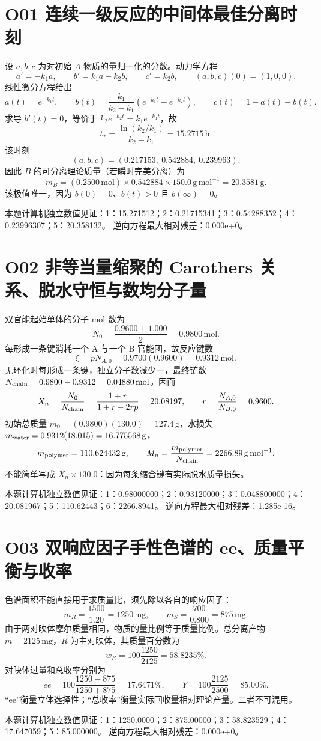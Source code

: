 \documentclass[UTF8,openany,11pt,a4paper]{ctexbook}
\begin{document}
\section{O01 \quad 连续一级反应的中间体最佳分离时刻}
设 \(a,b,c\) 为对初始 \(A\) 物质的量归一化的分数。动力学方程
\[
a'=-k_1a,\qquad b'=k_1a-k_2b,\qquad c'=k_2b,\qquad
(a,b,c)(0)=(1,0,0).
\]
线性微分方程给出
\[
a(t)=e^{-k_1t},\qquad
b(t)=\frac{k_1}{k_2-k_1}
\left(e^{-k_1t}-e^{-k_2t}\right),\qquad
c(t)=1-a(t)-b(t).
\]
求导 \(b'(t)=0\)，等价于 \(k_2e^{-k_2t}=k_1e^{-k_1t}\)，故
\[
t_*=\frac{\ln(k_2/k_1)}{k_2-k_1}
=15.2715\,\mathrm h.
\]
该时刻
\[
(a,b,c)=(0.217153,\ 0.542884,\ 0.239963).
\]
因此 \(B\) 的可分离理论质量（若瞬时完美分离）为
\[
m_B=(0.2500\,\mathrm{mol})\times0.542884\times
150.0\,\mathrm{g\,mol^{-1}}=20.3581\,\mathrm g.
\]
该极值唯一，因为 \(b(0)=0\)、\(b(t)>0\) 且 \(b(\infty)=0\)。
\begin{reviewnote}
本题计算机独立数值见证：1：15.271512；2：0.21715341；3：0.54288352；4：0.23996307；5：20.358132。
逆向方程最大相对残差：0.000e+0。
\end{reviewnote}
\section{O02 \quad 非等当量缩聚的 Carothers 关系、脱水守恒与数均分子量}
双官能起始单体的分子 mol 数为
\[
N_0=\frac{0.9600+1.000}{2}=0.9800\,\mathrm{mol}.
\]
每形成一条键消耗一个 A 与一个 B 官能团，故反应键数
\[
\xi=pN_{A,0}=0.9700(0.9600)=0.9312\,\mathrm{mol}.
\]
无环化时每形成一条键，独立分子数减少一，最终链数
\(N_{\rm chain}=0.9800-0.9312=0.04880\,\mathrm{mol}\)。因而
\[
X_n=\frac{N_0}{N_{\rm chain}}
=\frac{1+r}{1+r-2rp}
=20.08197,\qquad r=\frac{N_{A,0}}{N_{B,0}}=0.9600.
\]
初始总质量 \(m_0=(0.9800)(130.0)=127.4\,\mathrm g\)，水损失 \(m_{\rm water}=0.9312(18.015)=16.775568\,\mathrm g\)，
\[
m_{\rm polymer}=110.624432\,\mathrm g,\qquad
M_n=\frac{m_{\rm polymer}}{N_{\rm chain}}
=2266.89\,\mathrm{g\,mol^{-1}}.
\]
不能简单写成 \(X_n\times130.0\)：因为每条缩合键有实际脱水质量损失。
\begin{reviewnote}
本题计算机独立数值见证：1：0.98000000；2：0.93120000；3：0.048800000；4：20.081967；5：110.62443；6：2266.8941。
逆向方程最大相对残差：1.285e-16。
\end{reviewnote}
\section{O03 \quad 双响应因子手性色谱的 ee、质量平衡与收率}
色谱面积不能直接用于求质量比，须先除以各自的响应因子：
\[
m_R=\frac{1500}{1.20}=1250\,\mathrm{mg},\qquad
m_S=\frac{700}{0.800}=875\,\mathrm{mg}.
\]
由于两对映体摩尔质量相同，物质的量比例等于质量比例。总分离产物 \(m=2125\,\mathrm{mg}\)，\(R\) 为主对映体，其质量百分数为
\[
w_R=100\frac{1250}{2125}=58.8235\%.
\]
对映体过量和总收率分别为
\[
ee=100\frac{1250-875}{1250+875}=17.6471\%,\qquad
Y=100\frac{2125}{2500}=85.00\%.
\]
“ee”衡量立体选择性；“总收率”衡量实际回收量相对理论产量。二者不可混用。
\begin{reviewnote}
本题计算机独立数值见证：1：1250.0000；2：875.00000；3：58.823529；4：17.647059；5：85.000000。
逆向方程最大相对残差：0.000e+0。
\end{reviewnote}
\end{document}
